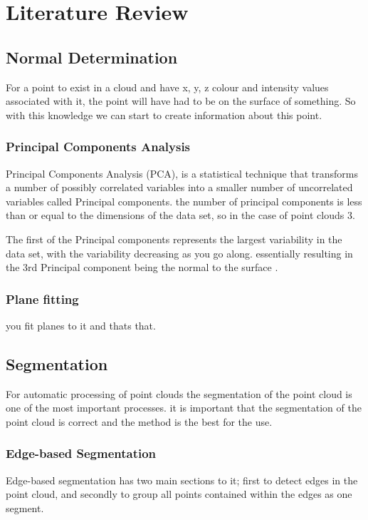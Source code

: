 
\section{Literature Review}

\subsection{Normal Determination}
	For a point to exist in a cloud and have x, y, z colour and intensity values associated with it, the point will have had to be on the surface of something. So with this knowledge we can start to create information about this point.
	
	\subsubsection{Principal Components Analysis}
	Principal Components Analysis (PCA), is a statistical technique that transforms a number of possibly correlated variables into a smaller number of uncorrelated variables called Principal components. the number of principal components is less than or equal to the dimensions of the data set, so in the case of point clouds 3.
	
	The first of the Principal components represents the largest variability in the data set, with the variability decreasing as you go along. essentially resulting in the 3rd Principal component being the normal to the surface \citep{dunteman_principal_1989}. 
	
	\subsubsection{Plane fitting}
		you fit planes to it and thats that.
	

	
\subsection{Segmentation}
	For automatic processing of point clouds the segmentation of the point cloud is one of the most important processes. it is important that the segmentation of the point cloud is correct and the method is the best for the use.

	\subsubsection{Edge-based Segmentation}
		Edge-based segmentation has two main sections to it; first to detect edges in the point cloud, and secondly to group all points contained within the edges as one segment.
		
